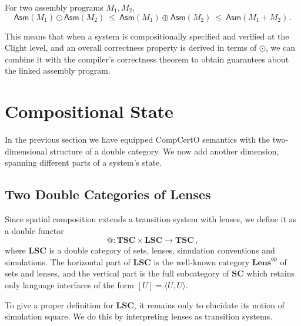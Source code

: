 \documentclass[acmsmall,screen,review,anonymous]{acmart}
\newcommand{\kw}[1]{\ensuremath{ \mathsf{#1} }}
\begin{document}
\begin{theorem}
For two assembly programs $M_1, M_2$,
\[
  \kw{Asm}(M_1) \odot \kw{Asm}(M_2)
  \:\le\:
  \kw{Asm}(M_1) \oplus \kw{Asm}(M_2)
  \:\le\:
  \kw{Asm}(M_1 + M_2)
 \,.
\]
\end{theorem}

This means that when a system is compositionally
specified and verified at the Clight level,
and an overall correctness property is derived
in terms of $\odot$,
we can combine it with the compiler's correctness theorem
to obtain guarantees about the linked assembly program.



\section{Compositional State} \label{sec:scomp} %

In the previous section
we have equipped CompCertO semantics
with the two-dimensional structure of a double category.
We now add another dimension,
spanning different parts of a system's state.

\subsection{Two Double Categories of Lenses} %

Since spatial composition extends a transition system with lenses,
we define it as a double functor
\[
  {\mathbin@} : \mathbf{TSC} \times \mathbf{LSC} \rightarrow \mathbf{TSC}
  \,,
\]
where $\mathbf{LSC}$ is a double category of
sets, lenses, simulation conventions and simulations.
The horizontal part of $\mathbf{LSC}$
is the well-known category $\mathbf{Lens}^\kw{op}$ of sets and lenses,
and the vertical part is the full subcategory of $\mathbf{SC}$
which retains only language interfaces of the form $[U] = \langle U, U \rangle$.

To give a proper definition for $\mathbf{LSC}$,
it remains only to elucidate its notion of simulation square.
We do this by interpreting lenses as transition systems.
\end{document}
